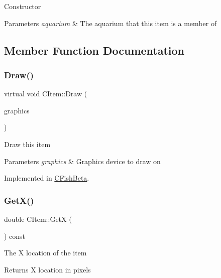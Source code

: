 Constructor 
\begin{DoxyParams}{Parameters}
{\em aquarium} & The aquarium that this item is a member of \\
\hline
\end{DoxyParams}


\subsection{Member Function Documentation}
\mbox{\label{class_c_item_a7ef8448d0c4bc53d0f1943a4dc817f6f}} 
\subsubsection{\texorpdfstring{Draw()}{Draw()}}
{\footnotesize\ttfamily virtual void C\+Item\+::\+Draw (\begin{DoxyParamCaption}\item[{Gdiplus\+::\+Graphics $\ast$}]{graphics }\end{DoxyParamCaption})\hspace{0.3cm}{\ttfamily [pure virtual]}}

Draw this item 
\begin{DoxyParams}{Parameters}
{\em graphics} & Graphics device to draw on \\
\hline
\end{DoxyParams}


Implemented in \mbox{\hyperlink{class_c_fish_beta_ae2effbff7b98bb3cd6e1070d61d5366e}{C\+Fish\+Beta}}.

\mbox{\label{class_c_item_a394d38a058fc53f0e958ca52248560c8}} 
\subsubsection{\texorpdfstring{Get\+X()}{GetX()}}
{\footnotesize\ttfamily double C\+Item\+::\+GetX (\begin{DoxyParamCaption}{ }\end{DoxyParamCaption}) const\hspace{0.3cm}{\ttfamily [inline]}}

The X location of the item \begin{DoxyReturn}{Returns}
X location in pixels 
\end{DoxyReturn}
\mbox{\label{class_c_item_ac0fe6be80f8ef19854d7f41b4803f658}} 

